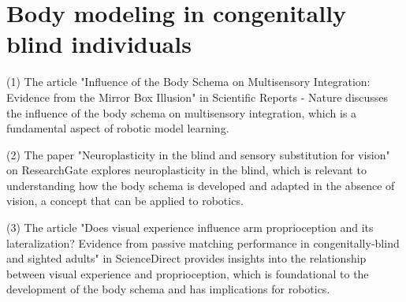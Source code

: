 
\section{Body modeling in congenitally blind individuals}
(1) The article "Influence of the Body Schema on Multisensory Integration: Evidence from the Mirror Box Illusion" in Scientific Reports - Nature discusses the influence of the body schema on multisensory integration, which is a fundamental aspect of robotic model learning.

(2) The paper "Neuroplasticity in the blind and sensory substitution for vision" on ResearchGate explores neuroplasticity in the blind, which is relevant to understanding how the body schema is developed and adapted in the absence of vision, a concept that can be applied to robotics.

(3) The article "Does visual experience influence arm proprioception and its lateralization? Evidence from passive matching performance in congenitally-blind and sighted adults" in ScienceDirect provides insights into the relationship between visual experience and proprioception, which is foundational to the development of the body schema and has implications for robotics.

